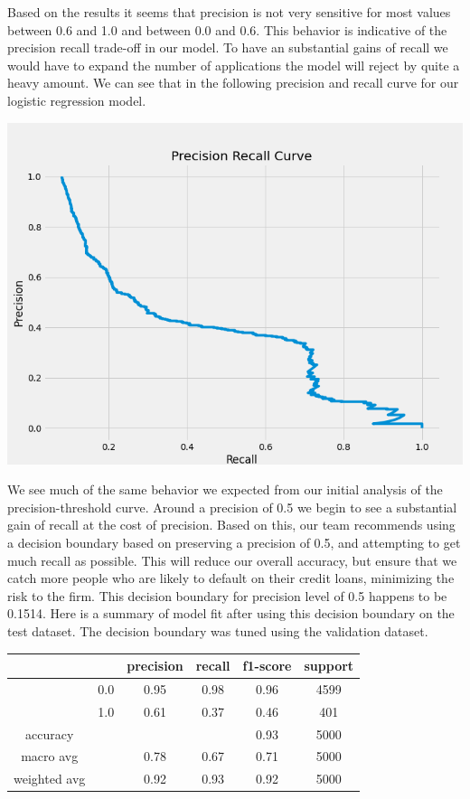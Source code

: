 \documentclass[12pt]{article}
\begin{document}
	Based on the results it seems that precision is not very sensitive for most values between 0.6 and 1.0 and between 0.0 and 0.6. This behavior is indicative of the precision recall trade-off in our model. To have an substantial gains of recall we would have to expand the number of applications the model will reject by quite a heavy amount. We can see that in the following precision and recall curve for our logistic regression model. 
	
	\begin{center}
		\includegraphics[scale=0.4]{../notebooks/pr_curve_lr.png}
	\end{center}

	We see much of the same behavior we expected from our initial analysis of the precision-threshold curve. Around a precision of 0.5 we begin to see a substantial gain of recall at the cost of precision. Based on this, our team recommends using a decision boundary based on preserving a precision of 0.5, and attempting to get much recall as possible. This will reduce our overall accuracy, but ensure that we catch more people who are likely to default on their credit loans, minimizing the risk to the firm. This decision boundary for precision level of 0.5 happens to be 0.1514. Here is a summary of model fit after using this decision boundary on the test dataset. The decision boundary was tuned using the validation dataset. 
	
	
	\begin{tabular}{c|c|c|c|c|c}
	\hline
				& 		& 	precision &  recall  & f1-score   & support \\ \hline
	
				&  0.0	&		0.95 &     0.98   &  0.96   &  4599 \\ \hline
				&  1.0  &		0.61 &     0.37   &  0.46   &   401 \\ \hline
	
	accuracy    & & & &                       		  0.93   &   5000 \\ \hline
	macro avg   & &   			0.78   &   0.67  &    0.71   &   5000  \\ \hline
	weighted avg  & &   		0.92   &   0.93  &    0.92   &   5000 \\ \hline
	\end{tabular}	
	 
\end{document}
